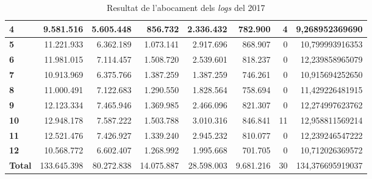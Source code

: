 \begin{table}[h!]
\begin{adjustbox}{width=1.5\textwidth, center}
\begin{tabular}{|l|r|r|r|r|r|r|r|}
            \textbf{4}     & 9.581.516   & 5.605.448  & 856.732    & 2.336.432  & 782.900   & 4  & 9,268952369690   \\
            \midrule
            \textbf{5}     & 11.221.933  & 6.362.189  & 1.073.141  & 2.917.696  & 868.907   & 0  & 10,799993916353  \\
            \textbf{6}     & 11.981.015  & 7.114.457  & 1.508.720  & 2.539.601  & 818.237   & 0  & 12,239858965079  \\
            \textbf{7}     & 10.913.969  & 6.375.766  & 1.387.259  & 1.387.259  & 746.261   & 0  & 10,915694252650  \\
            \textbf{8}     & 11.000.491  & 7.122.683  & 1.290.550  & 1.828.564  & 758.694   & 0  & 11,429226481915  \\
            \midrule
            \textbf{9}     & 12.123.334  & 7.465.946  & 1.369.985  & 2.466.096  & 821.307   & 0  & 12,274997623762  \\
            \textbf{10}    & 12.948.178  & 7.587.222  & 1.503.788  & 3.010.316  & 846.841   & 11 & 12,958811569214  \\
            \textbf{11}    & 12.521.476  & 7.426.927  & 1.339.240  & 2.945.232  & 810.077   & 0  & 12,239246547222  \\
            \textbf{12}    & 10.568.772  & 6.602.407  & 1.268.992  & 1.995.668  & 701.705   & 0  & 10,712026369572  \\
            \midrule
            \textbf{Total} & 133.645.398 & 80.272.838 & 14.075.887 & 28.598.003 & 9.681.216 & 30 & 134,376695919037 \\
            \bottomrule
        \end{tabular}
    \end{adjustbox}
    \caption{Resultat de l'abocament dels \textit{logs} del 2017}
    \label{tab:logs-table-2017}
\end{table}
